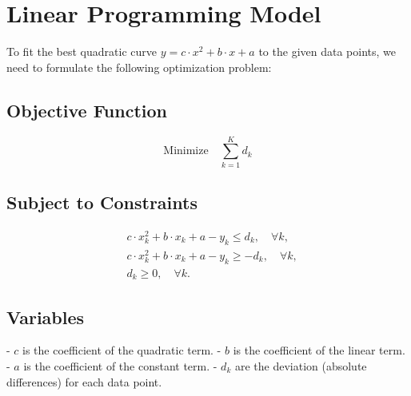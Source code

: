 \documentclass{article}
\begin{document}
\section*{Linear Programming Model}

To fit the best quadratic curve \( y = c \cdot x^2 + b \cdot x + a \) to the given data points, we need to formulate the following optimization problem:

\subsection*{Objective Function}
\[
\text{Minimize} \quad \sum_{k=1}^{K} d_k
\]

\subsection*{Subject to Constraints}
\begin{align*}
& c \cdot x_k^2 + b \cdot x_k + a - y_k \leq d_k, \quad \forall k, \\
& c \cdot x_k^2 + b \cdot x_k + a - y_k \geq -d_k, \quad \forall k, \\
& d_k \geq 0, \quad \forall k.
\end{align*}

\subsection*{Variables}
- \( c \) is the coefficient of the quadratic term.
- \( b \) is the coefficient of the linear term.
- \( a \) is the coefficient of the constant term.
- \( d_k \) are the deviation (absolute differences) for each data point.
\end{document}

